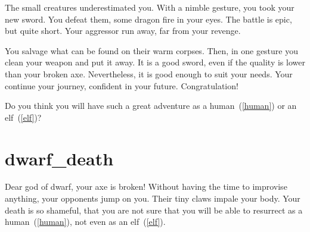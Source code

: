 The small creatures underestimated you. With a nimble gesture, you took your new
sword. You defeat them, some dragon fire in your eyes. The battle is epic, but
quite short. Your aggressor run away, far from your revenge.

You salvage what can be found on their warm corpses. Then, in one gesture you
clean your weapon and put it away. It is a good sword, even if the quality is
lower than your broken axe. Nevertheless, it is good enough to suit your needs.
Your continue your journey, confident in your future. Congratulation!

\medbreak

Do you think you will have such a great adventure as a human~(\ref{human}) or
an elf~(\ref{elf})?

\section{dwarf_death}

Dear god of dwarf, your axe is broken! Without having the time to improvise
anything, your opponents jump on you. Their tiny claws impale your body. Your
death is so shameful, that you are not sure that you will be able to resurrect as
a human~(\ref{human}), not even as an elf~(\ref{elf}).
